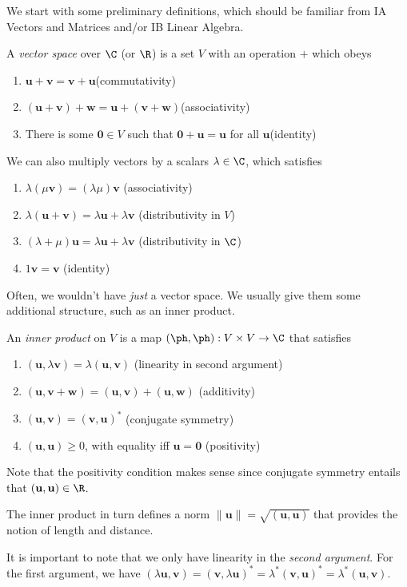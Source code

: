 \documentclass[a4paper]{article}
\begin{document}
We start with some preliminary definitions, which should be familiar from IA Vectors and Matrices and/or IB Linear Algebra.
\begin{defi}
  A \emph{vector space} over $\C$ (or $\R$) is a set $V$ with an operation $+$ which obeys
  \begin{enumerate}
    \item $\mathbf{u} + \mathbf{v} = \mathbf{v} + \mathbf{u}$\hfill (commutativity)
    \item $(\mathbf{u} + \mathbf{v}) + \mathbf{w} = \mathbf{u} + (\mathbf{v} + \mathbf{w})$\hfill (associativity)
    \item There is some $\mathbf{0}\in V$ such that $\mathbf{0} + \mathbf{u} = \mathbf{u}$ for all $\mathbf{u}$\hfill (identity)
  \end{enumerate}
  We can also multiply vectors by a scalars $\lambda\in \C$, which satisfies
  \begin{enumerate}
    \item $\lambda(\mu \mathbf{v}) = (\lambda \mu) \mathbf{v}$ \hfill (associativity)
    \item $\lambda(\mathbf{u} + \mathbf{v}) = \lambda \mathbf{u} + \lambda \mathbf{v}$ \hfill (distributivity in $V$)
    \item $(\lambda + \mu)\mathbf{u} = \lambda \mathbf{u} + \lambda \mathbf{v}$ \hfill (distributivity in $\C$)
    \item $1\mathbf{v} = \mathbf{v}$ \hfill (identity)
  \end{enumerate}
\end{defi}
Often, we wouldn't have \emph{just} a vector space. We usually give them some additional structure, such as an inner product.
\begin{defi}
  An \emph{inner product} on $V$ is a map $(\ph, \ph): V\times V \to \C$ that satisfies
  \begin{enumerate}
    \item $(\mathbf{u}, \lambda \mathbf{v}) = \lambda (\mathbf{u}, \mathbf{v})$ \hfill(linearity in second argument)
    \item $(\mathbf{u}, \mathbf{v} + \mathbf{w}) = (\mathbf{u}, \mathbf{v}) + (\mathbf{u}, \mathbf{w})$ \hfill (additivity)
    \item $(\mathbf{u}, \mathbf{v}) = (\mathbf{v}, \mathbf{u})^*$ \hfill (conjugate symmetry)
    \item $(\mathbf{u}, \mathbf{u}) \geq 0$, with equality iff $\mathbf{u} = \mathbf{0}$ \hfill (positivity)
  \end{enumerate}
  Note that the positivity condition makes sense since conjugate symmetry entails that $(\mathbf{u}, \mathbf{u}) \in \R$.

  The inner product in turn defines a norm $\|\mathbf{u}\| = \sqrt{(\mathbf{u}, \mathbf{u})}$ that provides the notion of length and distance.
\end{defi}
It is important to note that we only have linearity in the \emph{second argument}. For the first argument, we have $(\lambda \mathbf{u}, \mathbf{v}) = (\mathbf{v}, \lambda \mathbf{u})^* = \lambda^* (\mathbf{v}, \mathbf{u})^* = \lambda^* (\mathbf{u}, \mathbf{v})$.
\end{document}
